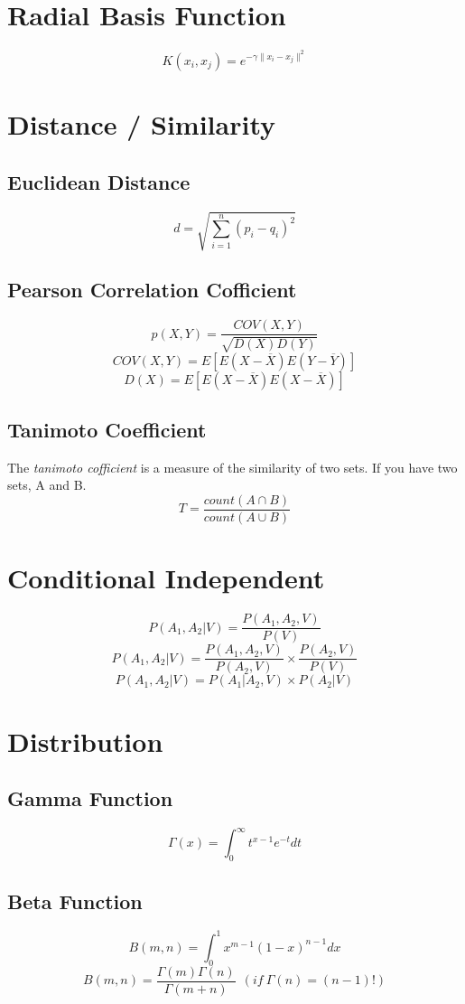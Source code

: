 \documentclass[twocolumn]{article}
\begin{document}
\section{Radial Basis Function}
\[
	K(x_i, x_j) = e^{-\gamma \|x_i - x_j \|^2}
\]

\section{Distance / Similarity}

\subsection{Euclidean Distance}
\[
	d = \sqrt{\sum_{i=1}^n (p_i - q_i)^2}
\]

\subsection{Pearson Correlation Cofficient}
\[
	p(X, Y) = \frac{COV(X, Y)}{\sqrt{D(X) D(Y)}}
\]
\[
	COV(X, Y) = E[E(X-\overline{X})E(Y-\overline{Y})]
\]
\[
	D(X) = E[E(X-\overline{X})E(X-\overline{X})]
\]

\subsection{Tanimoto Coefficient}
The \emph{tanimoto cofficient} is a measure of the similarity of two sets. If you have two sets, A and B. 
\[
	T = \frac{count(A \cap B)}{count(A \cup B)}
\]

\section{Conditional Independent}
\[P(A_1, A_2 | V) = \frac{P(A_1, A_2, V)}{P(V)} \]
\[P(A_1, A_2 | V) = \frac{P(A_1, A_2, V)}{P(A_2, V)} \times \frac{P(A_2, V)}{P(V)} \]
\[P(A_1, A_2 | V) = P(A_1 | A_2, V) \times P(A_2 | V) \]

\section{Distribution}
\subsection{Gamma Function}
\[\Gamma (x) = \int_0^{\infty}t^{x-1}e^{-t}dt \]

\subsection{Beta Function}
\[B(m,n) = \int_0^1 x^{m-1}(1-x)^{n-1}dx  \]
\[B(m,n) = \frac{\Gamma(m)\Gamma(n)}{\Gamma(m+n)} ~~(if ~ \Gamma(n) = (n-1)!) \]
\end{document}
